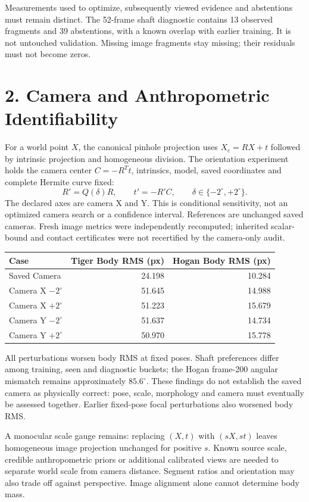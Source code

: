 \documentclass[11pt,a4paper]{article}
\begin{document}
Measurements used to optimize, subsequently viewed evidence and abstentions must remain distinct. The 52-frame shaft diagnostic contains 13 observed fragments and 39 abstentions, with a known overlap with earlier training. It is not untouched validation. Missing image fragments stay missing; their residuals must not become zeros.

\newpage
\section*{2. Camera and Anthropometric Identifiability}
For a world point $X$, the canonical pinhole projection uses $X_c=RX+t$ followed by intrinsic projection and homogeneous division. The orientation experiment holds the camera center $C=-R^Tt$, intrinsics, model, saved coordinates and complete Hermite curve fixed:
\[
 R'=Q(\delta)R,\qquad t'=-R'C,\qquad \delta\in\{-2^\circ,+2^\circ\}.
\]
The declared axes are camera X and Y. This is conditional sensitivity, not an optimized camera search or a confidence interval. References are unchanged saved cameras. Fresh image metrics were independently recomputed; inherited scalar-bound and contact certificates were not recertified by the camera-only audit.

\begin{center}\small
\begin{tabular}{lrr}
\toprule\textbf{Case} & \textbf{Tiger Body RMS (px)} & \textbf{Hogan Body RMS (px)}\\\midrule
Saved Camera &24.198&10.284\\
Camera X $-2^\circ$ &51.645&14.988\\
Camera X $+2^\circ$ &51.223&15.679\\
Camera Y $-2^\circ$ &51.637&14.734\\
Camera Y $+2^\circ$ &50.970&15.778\\\bottomrule
\end{tabular}\end{center}
All perturbations worsen body RMS at fixed poses. Shaft preferences differ among training, seen and diagnostic buckets; the Hogan frame-200 angular mismatch remains approximately $85.6^\circ$. These findings do not establish the saved camera as physically correct: pose, scale, morphology and camera must eventually be assessed together. Earlier fixed-pose focal perturbations also worsened body RMS.

A monocular scale gauge remains: replacing $(X,t)$ with $(sX,st)$ leaves homogeneous image projection unchanged for positive $s$. Known source scale, credible anthropometric priors or additional calibrated views are needed to separate world scale from camera distance. Segment ratios and orientation may also trade off against perspective. Image alignment alone cannot determine body mass.
\end{document}
